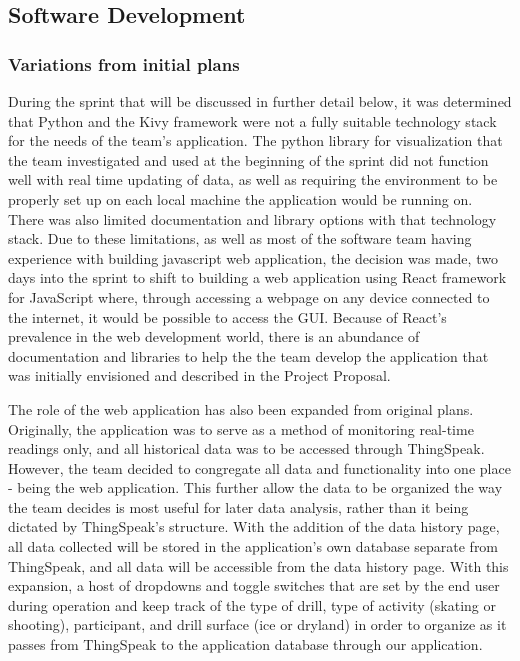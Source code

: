 \subsection{Software Development}
\subsubsection{Variations from initial plans}
During the sprint that will be discussed in further detail below, it was determined that Python and the Kivy framework were not a fully suitable technology stack for the needs of the team's application. The python library for visualization that the team investigated and used at the beginning of the sprint did not function well with real time updating of data, as well as requiring the environment to be properly set up on each local machine the application would be running on. There was also limited documentation and library options with that technology stack. Due to these limitations, as well as most of the software team having experience with building javascript web application, the decision was made, two days into the sprint to shift to building a web application using React framework for JavaScript where, through accessing a webpage on any device connected to the internet, it would be possible to access the GUI. Because of React's prevalence in the web development world, there is an abundance of documentation and libraries to help the the team develop the application that was initially envisioned and described in the Project Proposal. 

The role of the web application has also been expanded from original plans. Originally, the application was to serve as a method of monitoring real-time readings only, and all historical data was to be accessed through ThingSpeak. However, the team decided to congregate all data and functionality into one place - being the web application. This further allow the data to be organized the way the team decides is most useful for later data analysis, rather than it being dictated by ThingSpeak's structure. With the addition of the data history page, all data collected will be stored in the application's own database separate from ThingSpeak, and all data will be accessible from the data history page. With this expansion, a host of dropdowns and toggle switches that are set by the end user during operation and keep track of the type of drill, type of activity (skating or shooting), participant, and drill surface (ice or dryland) in order to organize as it passes from ThingSpeak to the application database through our application. 

